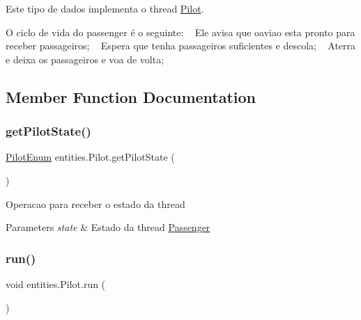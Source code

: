 Este tipo de dados implementa o thread \hyperlink{classentities_1_1_pilot}{Pilot}.

O ciclo de vida do passenger é o seguinte\+: ~\newline
 Ele avisa que oaviao esta pronto para receber passageiros; ~\newline
 Espera que tenha passageiros suficientes e descola; ~\newline
 Aterra e deixa os passageiros e voa de volta; 

\subsection{Member Function Documentation}
\mbox{\label{classentities_1_1_pilot_ac16922ae9aa6296ff7adfb1dcfa50d3a}} 
\subsubsection{\texorpdfstring{get\+Pilot\+State()}{getPilotState()}}
{\footnotesize\ttfamily \hyperlink{enumentities_1_1_pilot_enum}{Pilot\+Enum} entities.\+Pilot.\+get\+Pilot\+State (\begin{DoxyParamCaption}{ }\end{DoxyParamCaption})\hspace{0.3cm}{\ttfamily [inline]}}

Operacao para receber o estado da thread 
\begin{DoxyParams}{Parameters}
{\em state} & Estado da thread \hyperlink{classentities_1_1_passenger}{Passenger} \\
\hline
\end{DoxyParams}
\mbox{\label{classentities_1_1_pilot_aa0a1f2dd8931f01b03cdc2aa9e99acaf}} 
\subsubsection{\texorpdfstring{run()}{run()}}
{\footnotesize\ttfamily void entities.\+Pilot.\+run (\begin{DoxyParamCaption}{ }\end{DoxyParamCaption})\hspace{0.3cm}{\ttfamily [inline]}}


